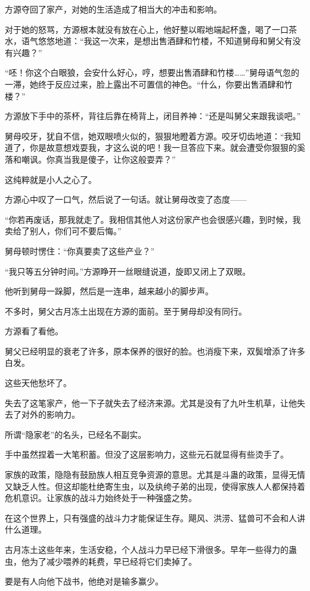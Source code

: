 \begin{this_body}
方源夺回了家产，对她的生活造成了相当大的冲击和影响。

对于她的怒骂，方源根本就没有放在心上，他好整以暇地端起杯盏，喝了一口茶水，语气悠悠地道：“我这一次来，是想出售酒肆和竹楼，不知道舅母和舅父有没有兴趣？”

“呸！你这个白眼狼，会安什么好心，哼，想要出售酒肆和竹楼……”舅母语气忽的一滞，她终于反应过来，脸上露出不可置信的神色。“什么，你要出售酒肆和竹楼？”

方源放下手中的茶杯，背往后靠在椅背上，闭目养神：“还是叫舅父来跟我谈吧。”

舅母咬牙，犹自不信，她双眼喷火似的，狠狠地瞪着方源。咬牙切齿地道：“我知道了，你是故意想戏耍我，才这么说的吧！我一旦答应下来。就会遭受你狠狠的奚落和嘲讽。你真当我是傻子，让你这般耍弄？”

这纯粹就是小人之心了。

方源心中叹了一口气，然后说了一句话。就让舅母改变了态度——

“你若再废话，那我就走了。我相信其他人对这份家产也会很感兴趣，到时候，我卖给了别人，你们可不要后悔。”

舅母顿时愣住：“你真要卖了这些产业？”

“我只等五分钟时间。”方源睁开一丝眼缝说道，旋即又闭上了双眼。

他听到舅母一跺脚，然后是一连串，越来越小的脚步声。

不多时，舅父古月冻土出现在方源的面前。至于舅母却没有同行。

方源看了看他。

舅父已经明显的衰老了许多，原本保养的很好的脸。也消瘦下来，双鬓增添了许多白发。

这些天他愁坏了。

失去了这笔家产，他一下子就失去了经济来源。尤其是没有了九叶生机草，让他失去了对外的影响力。

所谓“隐家老”的名头，已经名不副实。

手中虽然捏着一大笔积蓄。但没了这层影响力，这些元石就显得有些烫手了。

家族的政策，隐隐有鼓励族人相互竞争资源的意思。尤其是斗蛊的政策，显得无情又缺乏人性。但这却能杜绝寄生虫，以及纨绔子弟的出现，使得家族人人都保持着危机意识。让家族的战斗力始终处于一种强盛之势。

在这个世界上，只有强盛的战斗力才能保证生存。飓风、洪涝、猛兽可不会和人讲什么道理。

古月冻土这些年来，生活安稳，个人战斗力早已经下滑很多。早年一些得力的蛊虫，他为了减少喂养的耗费，早已经将它们卖掉了。

要是有人向他下战书，他绝对是输多赢少。


\end{this_body}
